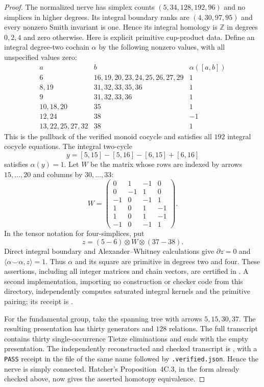 \begin{proof}
The normalized nerve has simplex counts $(5,34,128,192,96)$ and no
simplices in higher degrees. Its integral boundary ranks are
$(4,30,97,95)$ and every nonzero Smith invariant is one. Hence
its integral homology is $\mathbb Z$ in degrees $0,2,4$ and zero
otherwise. Here is explicit primitive cup-product data. Define
an integral degree-two cochain $\alpha$ by the following nonzero
values, with all unspecified values zero:
\[
\begin{array}{c|l|r}
a&b&\alpha([a,b])\\\hline
6&16,19,20,23,24,25,26,27,29&1\\
8,19&31,32,33,35,36&1\\
9&31,32,33,36&1\\
10,18,20&35&1\\
12,24&38&-1\\
13,22,25,27,32&38&1
\end{array}
\]
This is the pullback of the verified monoid cocycle and satisfies
all $192$ integral cocycle equations. The integral two-cycle
\[
 y=[5,15]-[5,16]-[6,15]+[6,16]
\]
satisfies $\alpha(y)=1$. Let $W$ be the matrix whose rows are
indexed by arrows $15,\ldots,20$ and columns by $30,\ldots,33$:
\[
 W=\begin{pmatrix}
 0&1&-1&0\\
 0&-1&1&0\\
 -1&0&-1&1\\
 1&0&1&-1\\
 1&0&1&-1\\
 -1&0&-1&1
 \end{pmatrix}.
\]
In the tensor notation for four-simplices, put
\[
 z=(5-6)\otimes W\otimes(37-38).
\]
Direct integral boundary and Alexander--Whitney calculations give
$\partial z=0$ and $\langle\alpha\smile\alpha,z\rangle=1$.
Thus $\alpha$ and its square are primitive in degrees two and four.
These assertions, including all integer matrices and chain vectors,
are certified in
.
A second implementation, importing no construction or checker code
from this directory, independently computes saturated integral
kernels and the primitive pairing; its receipt is
.

For the fundamental group, take the spanning tree with arrows
$5,15,30,37$. The resulting presentation has thirty generators
and $128$ relations. The full transcript contains thirty
single-occurrence Tietze eliminations and ends with the empty
presentation. The independently reconstructed and checked transcript
is , with a
\texttt{PASS} receipt in the file of the same name followed by
\texttt{.verified.json}. Hence the nerve is simply connected.
Hatcher's Proposition~4C.3, in the form already checked above,
now gives the asserted homotopy equivalence.
\end{proof}

